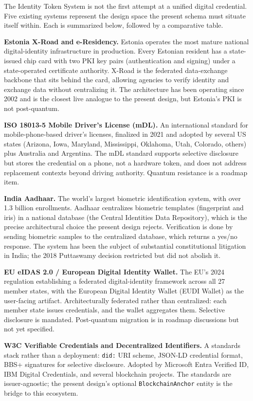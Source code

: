 \documentclass[11pt,letterpaper]{article}
\newcommand{\entity}[1]{\texttt{\color{navydark}#1}}
\begin{document}
The Identity Token System is not the first attempt at a unified digital credential. Five existing systems represent the design space the present schema must situate itself within. Each is summarized below, followed by a comparative table.

\textbf{Estonia X-Road and e-Residency.} Estonia operates the most mature national digital-identity infrastructure in production. Every Estonian resident has a state-issued chip card with two PKI key pairs (authentication and signing) under a state-operated certificate authority. X-Road is the federated data-exchange backbone that sits behind the card, allowing agencies to verify identity and exchange data without centralizing it. The architecture has been operating since 2002 and is the closest live analogue to the present design, but Estonia's PKI is not post-quantum.

\textbf{ISO 18013-5 Mobile Driver's License (mDL).} An international standard for mobile-phone-based driver's licenses, finalized in 2021 and adopted by several US states (Arizona, Iowa, Maryland, Mississippi, Oklahoma, Utah, Colorado, others) plus Australia and Argentina. The mDL standard supports selective disclosure but stores the credential on a phone, not a hardware token, and does not address replacement contexts beyond driving authority. Quantum resistance is a roadmap item.

\textbf{India Aadhaar.} The world's largest biometric identification system, with over 1.3 billion enrollments. Aadhaar centralizes biometric templates (fingerprint and iris) in a national database (the Central Identities Data Repository), which is the precise architectural choice the present design rejects. Verification is done by sending biometric samples to the centralized database, which returns a yes/no response. The system has been the subject of substantial constitutional litigation in India; the 2018 Puttaswamy decision restricted but did not abolish it.

\textbf{EU eIDAS 2.0 / European Digital Identity Wallet.} The EU's 2024 regulation establishing a federated digital-identity framework across all 27 member states, with the European Digital Identity Wallet (EUDI Wallet) as the user-facing artifact. Architecturally federated rather than centralized: each member state issues credentials, and the wallet aggregates them. Selective disclosure is mandated. Post-quantum migration is in roadmap discussions but not yet specified.

\textbf{W3C Verifiable Credentials and Decentralized Identifiers.} A standards stack rather than a deployment: \texttt{did:} URI scheme, JSON-LD credential format, BBS+ signatures for selective disclosure. Adopted by Microsoft Entra Verified ID, IBM Digital Credentials, and several blockchain projects. The standards are issuer-agnostic; the present design's optional \entity{BlockchainAnchor} entity is the bridge to this ecosystem.
\end{document}
